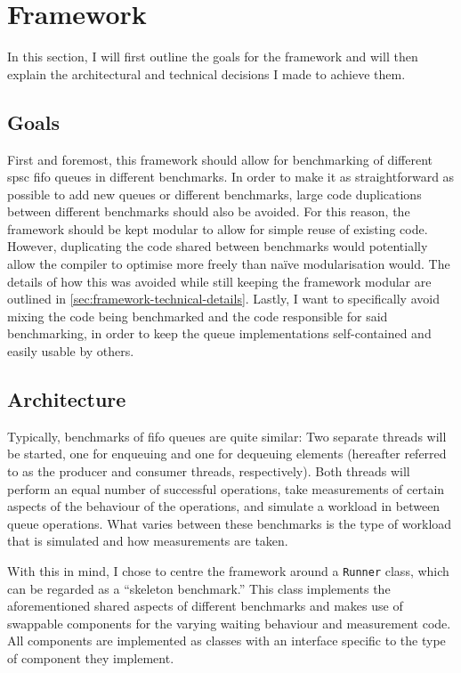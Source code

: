 \chapter{Framework}
\label{ch:framework}
In this section, I will first outline the goals for the framework and will then explain the
architectural and technical decisions I made to achieve them.

\section{Goals}
First and foremost, this framework should allow for benchmarking of different \acrshort{spsc} \acrshort{fifo}
queues in different benchmarks.
In order to make it as straightforward as possible to add new queues or different benchmarks, large code
duplications between different benchmarks should also be avoided.
For this reason, the framework should be kept modular to allow for simple reuse of existing code.
However, duplicating the code shared between benchmarks would potentially allow the compiler to optimise more
freely than na\"ive modularisation would. The details of how this was avoided while still keeping the
framework modular are outlined in \autoref{sec:framework-technical-details}.
Lastly, I want to specifically avoid mixing the code being benchmarked and the code responsible for said
benchmarking, in order to keep the queue implementations self-contained and easily usable by others.

\section{Architecture}
Typically, benchmarks of \acrshort{fifo} queues are quite similar\cite{EQueue,B-Queue,MCRingBuffer}:
Two separate threads will be started, one for enqueuing and one for dequeuing elements
(hereafter referred to as the producer and consumer threads, respectively).
Both threads will perform an equal number of successful operations, take measurements of certain
aspects of the behaviour of the operations, and simulate a workload in between queue operations.
What varies between these benchmarks is the type of workload that is simulated and how measurements are taken.

With this in mind, I chose to centre the framework around a \texttt{Runner} class, which can be regarded as a
``skeleton benchmark.''
This class implements the aforementioned shared aspects of different benchmarks and makes use of swappable
components for the varying waiting behaviour and measurement code.
All components are implemented as classes with an interface specific to the type of component they implement.

